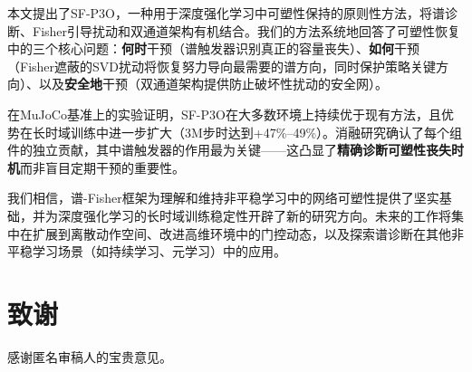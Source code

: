 \documentclass[twocolumn]{article}
\begin{document}
本文提出了SF-P3O，一种用于深度强化学习中可塑性保持的原则性方法，将谱诊断、Fisher引导扰动和双通道架构有机结合。我们的方法系统地回答了可塑性恢复中的三个核心问题：\textbf{何时}干预（谱触发器识别真正的容量丧失）、\textbf{如何}干预（Fisher遮蔽的SVD扰动将恢复努力导向最需要的谱方向，同时保护策略关键方向）、以及\textbf{安全地}干预（双通道架构提供防止破坏性扰动的安全网）。

在MuJoCo基准上的实验证明，SF-P3O在大多数环境上持续优于现有方法，且优势在长时域训练中进一步扩大（3M步时达到+47\%--49\%）。消融研究确认了每个组件的独立贡献，其中谱触发器的作用最为关键——这凸显了\textbf{精确诊断可塑性丧失时机}而非盲目定期干预的重要性。

我们相信，谱-Fisher框架为理解和维持非平稳学习中的网络可塑性提供了坚实基础，并为深度强化学习的长时域训练稳定性开辟了新的研究方向。未来的工作将集中在扩展到离散动作空间、改进高维环境中的门控动态，以及探索谱诊断在其他非平稳学习场景（如持续学习、元学习）中的应用。


\section*{致谢}
感谢匿名审稿人的宝贵意见。
\end{document}
